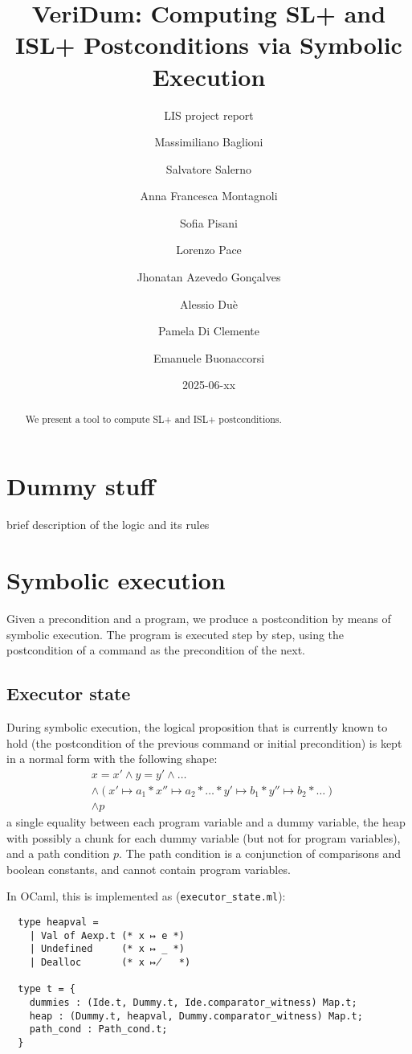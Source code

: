 \documentclass[parskip=half]{scrartcl}
\title{VeriDum: Computing SL+ and ISL+ Postconditions via Symbolic Execution}
\subtitle{LIS project report}
\date{2025-06-xx}
\author{ %
  Massimiliano Baglioni      \and
  Salvatore Salerno          \and
  Anna Francesca Montagnoli  \and
  Sofia Pisani               \and
  Lorenzo Pace               \and
  Jhonatan Azevedo Gonçalves \and
  Alessio Duè                \and
  Pamela Di Clemente         \and
  Emanuele Buonaccorsi}
\begin{document}
\maketitle

\begin{abstract}
  We present a tool to compute SL+ and ISL+ postconditions.
\end{abstract}

\section{Dummy stuff}

brief description of the logic and its rules

\section{Symbolic execution}

Given a precondition and a program, we produce a postcondition by means of symbolic execution. The program is executed step by step, using the postcondition of a command as the precondition of the next.

\subsection{Executor state}

During symbolic execution, the logical proposition that is currently known to hold (\ie the postcondition of the previous command or initial precondition) is kept in a normal form with the following shape:
\begin{align*}
  &x = x' \wedge y = y' \wedge \dots \\
  &\wedge (x' \mapsto a_1 \ast x'' \mapsto a_2 \ast \dots \ast y' \mapsto b_1 \ast y'' \mapsto b_2 \ast \dots) \\
  &\wedge p
\end{align*}
\ie a single equality between each program variable and a dummy variable, the heap with possibly a chunk for each dummy variable (but not for program variables), and a path condition \(p\). The path condition is a conjunction of comparisons and boolean constants, and cannot contain program variables.

In OCaml, this is implemented as (\texttt{executor\_state.ml}):
\begin{verbatim}
  type heapval =
    | Val of Aexp.t (* x ↦ e *)
    | Undefined     (* x ↦ _ *)
    | Dealloc       (* x ↦̸   *)

  type t = {
    dummies : (Ide.t, Dummy.t, Ide.comparator_witness) Map.t;
    heap : (Dummy.t, heapval, Dummy.comparator_witness) Map.t;
    path_cond : Path_cond.t;
  }
\end{verbatim}
\end{document}
